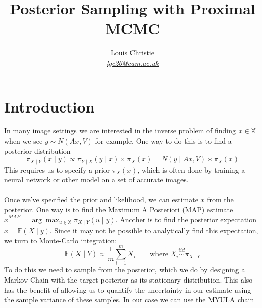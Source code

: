 \documentclass[a4paper,10pt]{article}
\newcommand{\EE}{\mathbb{E}}
\numberwithin{equation}{section}
\numberwithin{thm}{section}
\begin{document}
\title{Posterior Sampling with Proximal MCMC}
\author{Louis Christie \\ \href{mailto:lgc26@cam.ac.uk}{\textit{lgc26@cam.ac.uk}} }
\maketitle

\doublespacing


\section{Introduction}

In many image settings we are interested in the inverse problem of finding $x \in \mathbb{X}$ when we see $y \sim N( Ax, V )$ for example. One way to do this is to find a posterior distribution 
\begin{equation}
\label{eq:posterior}
\pi_{X \mid Y} (x \mid y ) \propto \pi_{Y \mid X } ( y \mid x ) \times \pi_X (x) = N( y \mid Ax, V) \times \pi_X(x)
\end{equation}
This requires us to specify a prior $\pi_X(x)$, which is often done by training a neural network or other model on a set of accurate images. \\
\\
Once we've specified the prior and likelihood, we can estimate $x$ from the posterior. One way is to find the Maximum A Posteriori (MAP) estimate $\hat{x}^{MAP} = \arg \max_{u \in \mathbb{X} } \pi_{X \mid Y}(u \mid y)$. Another is to find the posterior expectation $\hat{x} = \EE( X \mid y )$. Since it may not be possible to analytically find this expectation, we turn to Monte-Carlo integration:
\begin{equation}
 \EE( X \mid Y ) \approx \frac{1}{m} \sum_{i = 1}^m X_i \qquad \text{where } X_i \overset{iid}{\sim} \pi_{X \mid Y}
\end{equation}
To do this we need to sample from the posterior, which we do by designing a Markov Chain with the target posterior as its stationary distribution. This also has the benefit of allowing us to quantify the uncertainty in our estimate using the sample variance of these samples. In our case we can use the MYULA chain
\end{document}
